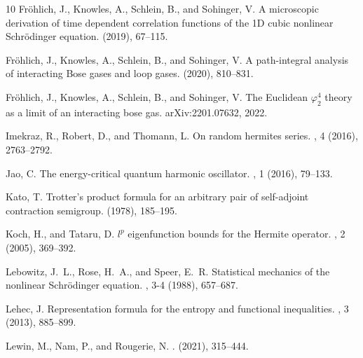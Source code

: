 \documentclass[%
11pt,  reqno]{amsart}
\theoremstyle{remarkstyle}
\newcommand{\1}{\hspace{0.2mm}\text{I}\hspace{0.2mm}}
\numberwithin{equation}{section}
\numberwithin{theorem}{section}
\begin{document}
\begin{thebibliography}{10}
		{\sc Fr\"ohlich, J., Knowles, A., Schlein, B., and Sohinger, V.}
		\newblock A microscopic derivation of time dependent correlation functions of
		the {1D} cubic nonlinear {S}chrödinger equation.
		 (2019), 67--115.
		
		{\sc Fr\"ohlich, J., Knowles, A., Schlein, B., and Sohinger, V.}
		\newblock A path-integral analysis of interacting {B}ose gases and loop gases.
		 (2020), 810--831.
		
		{\sc Fr\"ohlich, J., Knowles, A., Schlein, B., and Sohinger, V.}
		\newblock The {E}uclidean $\varphi ^4_2$ theory as a limit of an interacting
		bose gas.
		\newblock arXiv:2201.07632, 2022.
		
		{\sc Imekraz, R., Robert, D., and Thomann, L.}
		\newblock On random hermites series.
		, 4 (2016),
		2763--2792.
		
		{\sc Jao, C.}
		\newblock The energy-critical quantum harmonic oscillator.
		, 1 (2016),
		79--133.
		
		{\sc Kato, T.}
		\newblock Trotter's product formula for an arbitrary pair of self-adjoint
		contraction semigroup.
		 (1978),
		185--195.
		
		{\sc Koch, H., and Tataru, D.}
		\newblock $l^p$ eigenfunction bounds for the {H}ermite operator.
		, 2 (2005), 369--392.
		
		{\sc Lebowitz, J.~L., Rose, H.~A., and Speer, E.~R.}
		\newblock Statistical mechanics of the nonlinear {S}chr{\"o}dinger equation.
		, 3-4 (1988), 657--687.
		
		{\sc Lehec, J.}
		\newblock Representation formula for the entropy and functional inequalities.
		, 3 (2013),
		885--899.
		
		{\sc Lewin, M., Nam, P., and Rougerie, N.}
		.
		 (2021), 315--444.
		

\end{thebibliography}
\end{document}
